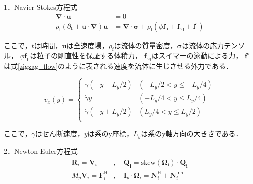 \documentclass[twocolumns,10pt,a4j]{jarticle}
\begin{document}
\par
1．Navier-Stokes方程式\\
  \vspace{-3truemm}
  \small
  \begin{equation}
    \begin{split}
      \boldsymbol{\nabla}\cdot\boldsymbol{u} &= 0 \\
      \rho_\mathrm{f} \left(\partial_\mathrm{t} + \boldsymbol{u} \cdot \boldsymbol{\nabla} \right) \boldsymbol{u} &= \boldsymbol{\nabla} \cdot \boldsymbol{\sigma} + \rho_\mathrm{f} \left( \phi \boldsymbol{f}_\mathrm{p} + \boldsymbol{f}_\mathrm{sq} + \boldsymbol{f}^\mathrm{s} \right)
    \end{split}
    \label{Navier_Stokes}
  \end{equation}
  \normalsize
  \vspace{-4truemm}

  \noindent
ここで，$t$は時間，$\boldsymbol{u}$は全速度場，$\rho_\mathrm{f}$は流体の質量密度，$\boldsymbol{\sigma}$は流体の応力テンソル，
$\phi \boldsymbol{f}_\mathrm{p}$は粒子の剛直性を保証する体積力，
$\boldsymbol{f}_\mathrm{sq}$はスイマーの泳動による力，
$\boldsymbol{f}^\mathrm{s}$は式\eqref{zigzag_flow}のように表される速度を流体に生じさせる外力である．
  \par
  \vspace{-6truemm}
  \small
  \begin{equation}
    v_x(y) =
    \begin{cases}
      \dot{\gamma} (-y - L_y/2) & (-L_y/2 < y \le -L_y/4) \\
      \dot{\gamma} y            & (-L_y/4 < y \le L_y/4) \\
      \dot{\gamma} (-y + L_y/2) & (L_y/4 < y \le L_y/2)\\
    \end{cases}
    \label{zigzag_flow}
  \end{equation}
  \normalsize
  \vspace{-4truemm}

  \noindent
 ここで，$\dot{\gamma}$はせん断速度，$y$は系のy座標，$L_y$は系のy軸方向の大きさである．

  \par
2．Newton-Euler方程式\\
  \vspace{-6truemm}
  \begin{equation}
    \begin{split}
      \dot{\boldsymbol{R}}_i = \boldsymbol{V}_i &, \quad \boldsymbol{\dot{Q_i}} = \mathrm{skew} (\boldsymbol{\Omega_i}) \cdot \boldsymbol{Q_i} \\
      M_p \dot{\boldsymbol{V}_i} = \boldsymbol{F}_i^\mathrm{H} &, \quad
      \boldsymbol{I}_p \cdot \dot{\boldsymbol{\Omega}_i} = \boldsymbol{N}_i^\mathrm{H} + \boldsymbol{N}_i^\mathrm{b.h.}
    \end{split}
    \label{Newton_Euler}
  \end{equation}
  \vspace{-4truemm}
\end{document}

